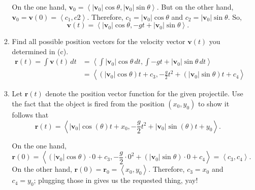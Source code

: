 \documentclass[10pt]{article}
\newcommand{\vv}{\mathbf{v}}
\newcommand{\vr}{\mathbf{r}}
\newenvironment{red}{\color{red}}{\ignorespacesafterend}
\begin{document}
\begin{enumerate}[leftmargin=0pt]
\begin{enumerate}
    \begin{red}
        On the one hand, $\vv_0 = \left\langle |\vv_0|\cos\theta, |\vv_0|\sin\theta \right\rangle$. But on the other hand, $\vv_0 = \vv(0) = \left\langle c_1, c2 \right\rangle$. 
        Therefore, $c_1 = |\vv_0|\cos\theta$ and $c_2 = |\vv_0|\sin\theta$. So,
        \[\vv(t) = \left\langle |\vv_0|\cos\theta, -gt + |\vv_0|\sin\theta \right\rangle.\]
    \end{red}
    \item Find all possible position vectors for the velocity vector $\vv(t)$ you determined in (c).
    \begin{red}
        \begin{align*}
            \vr(t) = \int \vv(t)\, dt &= \left\langle \int |\vv_0|\cos\theta\, dt, \int -gt + |\vv_0|\sin\theta\,dt \right\rangle \\
            &= \left\langle
                (|\vv_0|\cos\theta)t + c_3, 
                -\frac{g}{2} t^2 + (|\vv_0|\sin\theta )t + c_4
            \right\rangle
        \end{align*}
    \end{red}
    \item Let $\vr(t)$ denote the position vector function for the given projectile. Use the fact that the object is fired from the position $(x_0, y_0)$ to show it follows that
    \begin{equation*}
        \vr(t) = \left\langle |\vv_0| \cos(\theta)t + x_0, -\frac{g}{2}t^2 + |\vv_0| \sin(\theta)t + y_0 \right\rangle.
    \end{equation*}
    
    \begin{red}
        On the one hand, 
        \[\vr(0) = \left\langle
            (|\vv_0|\cos\theta)\cdot 0 + c_3, 
            -\frac{g}{2}\cdot  0^2 + (|\vv_0|\sin\theta )\cdot 0 + c_4
        \right\rangle = \left\langle c_3, c_4\right\rangle.\]
        On the other hand, $\vr(0) = \vr_0 = \left\langle x_0, y_0 \right\rangle$. 
        Therefore, $c_3 = x_0$ and $c_4 = y_0$; plugging those in gives us the requested thing, yay!
    \end{red}
\end{enumerate}


\end{enumerate}
\end{document}
